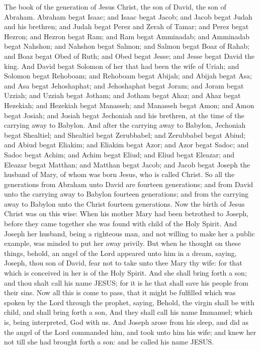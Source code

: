 


The book of the generation of Jesus Christ, the son of David, the son of Abraham.  Abraham begat Isaac; and Isaac begat Jacob; and Jacob begat Judah and his brethren; and Judah begat Perez and Zerah of Tamar; and Perez begat Hezron; and Hezron begat Ram; and Ram begat Amminadab; and Amminadab begat Nahshon; and Nahshon begat Salmon; and Salmon begat Boaz of Rahab; and Boaz begat Obed of Ruth; and Obed begat Jesse; and Jesse begat David the king. And David begat Solomon of her that had been the wife of Uriah; and Solomon begat Rehoboam; and Rehoboam begat Abijah; and Abijah begat Asa; and Asa begat Jehoshaphat; and Jehoshaphat begat Joram; and Joram begat Uzziah; and Uzziah begat Jotham; and Jotham begat Ahaz; and Ahaz begat Hezekiah; and Hezekiah begat Manasseh; and Manasseh begat Amon; and Amon begat Josiah; and Josiah begat Jechoniah and his brethren, at the time of the carrying away to Babylon.  And after the carrying away to Babylon, Jechoniah begat Shealtiel; and Shealtiel begat Zerubbabel; and Zerubbabel begat Abiud; and Abiud begat Eliakim; and Eliakim begat Azor; and Azor begat Sadoc; and Sadoc begat Achim; and Achim begat Eliud; and Eliud begat Eleazar; and Eleazar begat Matthan; and Matthan begat Jacob; and Jacob begat Joseph the husband of Mary, of whom was born Jesus, who is called Christ.  So all the generations from Abraham unto David are fourteen generations; and from David unto the carrying away to Babylon fourteen generations; and from the carrying away to Babylon unto the Christ fourteen generations.  Now the birth of Jesus Christ was on this wise: When his mother Mary had been betrothed to Joseph, before they came together she was found with child of the Holy Spirit. And Joseph her husband, being a righteous man, and not willing to make her a public example, was minded to put her away privily. But when he thought on these things, behold, an angel of the Lord appeared unto him in a dream, saying, Joseph, thou son of David, fear not to take unto thee Mary thy wife: for that which is conceived in her is of the Holy Spirit. And she shall bring forth a son; and thou shalt call his name JESUS; for it is he that shall save his people from their sins. Now all this is come to pass, that it might be fulfilled which was spoken by the Lord through the prophet, saying,  Behold, the virgin shall be with child, and shall bring forth a son, And they shall call his name Immanuel; which is, being interpreted, God with us. And Joseph arose from his sleep, and did as the angel of the Lord commanded him, and took unto him his wife; and knew her not till she had brought forth a son: and he called his name JESUS. 

